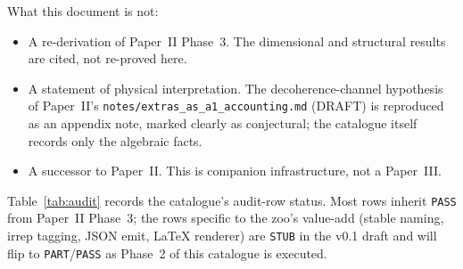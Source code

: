 What this document is not:

\begin{itemize}
\item A re-derivation of Paper~II Phase~3.  The dimensional and
      structural results are cited, not re-proved here.
\item A statement of physical interpretation.  The
      decoherence-channel hypothesis of Paper~II's
      \texttt{notes/extras\_as\_a1\_accounting.md} (DRAFT) is
      reproduced as an appendix note, marked clearly as
      conjectural; the catalogue itself records only the algebraic
      facts.
\item A successor to Paper~II.  This is companion infrastructure,
      not a Paper~III.
\end{itemize}

Table~\ref{tab:audit} records the catalogue's audit-row status.
Most rows inherit \texttt{PASS} from Paper~II Phase~3; the rows
specific to the zoo's value-add (stable naming, irrep tagging,
JSON emit, LaTeX renderer) are \texttt{STUB} in the v0.1 draft and
will flip to \texttt{PART}/\texttt{PASS} as Phase~2 of this
catalogue is executed.


